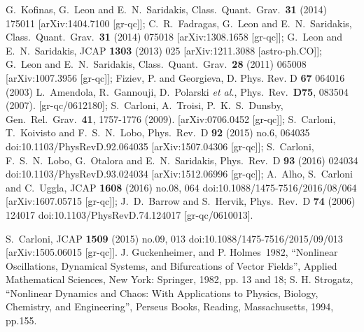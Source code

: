 \documentclass[a4paper,aps,onecolumn,nofootinbib]{revtex4}
\begin{document}
\begin{thebibliography}{999}
  G.~Kofinas, G.~Leon and E.~N.~Saridakis,
  Class.\ Quant.\ Grav.\  {\bf 31} (2014) 175011
  [arXiv:1404.7100 [gr-qc]];
   C.~R.~Fadragas, G.~Leon and E.~N.~Saridakis,
  Class.\ Quant.\ Grav.\  {\bf 31} (2014) 075018
  [arXiv:1308.1658 [gr-qc]];
  G.~Leon and E.~N.~Saridakis,
  JCAP {\bf 1303} (2013) 025
  [arXiv:1211.3088 [astro-ph.CO]];
   G.~Leon and E.~N.~Saridakis,
  Class.\ Quant.\ Grav.\  {\bf 28} (2011) 065008
  [arXiv:1007.3956 [gr-qc]];
 Fiziev, P. and Georgieva, D. Phys. Rev. D {\bf 67} 064016 (2003)
  L.~Amendola, R.~Gannouji, D.~Polarski {\it et al.},
  Phys.\ Rev.\  {\bf D75}, 083504 (2007).
  [gr-qc/0612180];
  S.~Carloni, A.~Troisi, P.~K.~S.~Dunsby,
  Gen.\ Rel.\ Grav.\  {\bf 41}, 1757-1776 (2009).
  [arXiv:0706.0452 [gr-qc]];
    S.~Carloni, T.~Koivisto and F.~S.~N.~Lobo,
  Phys.\ Rev.\ D {\bf 92} (2015) no.6,  064035
  doi:10.1103/PhysRevD.92.064035
  [arXiv:1507.04306 [gr-qc]];
  S.~Carloni, F.~S.~N.~Lobo, G.~Otalora and E.~N.~Saridakis,
  Phys.\ Rev.\ D {\bf 93} (2016) 024034
  doi:10.1103/PhysRevD.93.024034
  [arXiv:1512.06996 [gr-qc]];
    A.~Alho, S.~Carloni and C.~Uggla,
  JCAP {\bf 1608} (2016) no.08,  064
  doi:10.1088/1475-7516/2016/08/064
  [arXiv:1607.05715 [gr-qc]];
  J.~D.~Barrow and S.~Hervik,
  Phys.\ Rev.\ D {\bf 74} (2006) 124017
  doi:10.1103/PhysRevD.74.124017
  [gr-qc/0610013].

  S.~Carloni,
  JCAP {\bf 1509} (2015) no.09,  013
  doi:10.1088/1475-7516/2015/09/013
  [arXiv:1505.06015 [gr-qc]].
   J. Guckenheimer, and P. Holmes\ 1982, ``Nonlinear Oscillations, Dynamical Systems, and Bifurcations of Vector Fields'', Applied Mathematical Sciences, New York: Springer, 1982,  pp. 13 and 18; S. H. Strogatz, ``Nonlinear Dynamics and Chaos: With Applications to Physics, Biology, Chemistry, and Engineering'', Perseus Books, Reading, Massachusetts, 1994, pp.155.

\end{thebibliography}
\end{document}
